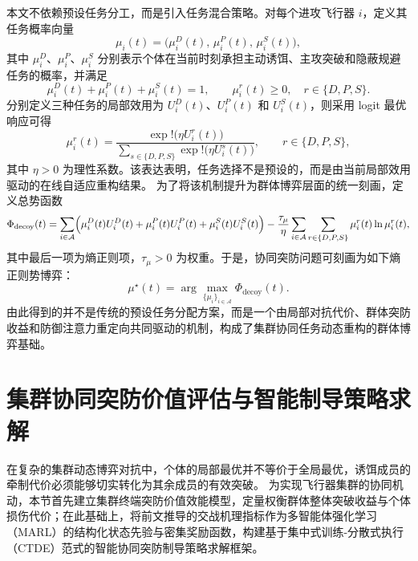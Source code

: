 本文不依赖预设任务分工，而是引入任务混合策略。对每个进攻飞行器 $i$，定义其任务概率向量
\begin{equation}
\mu_i(t)=
\bigl(
\mu_i^{D}(t),\,
\mu_i^{P}(t),\,
\mu_i^{S}(t)
\bigr),
\end{equation}
其中 $\mu_i^{D}$、$\mu_i^{P}$、$\mu_i^{S}$ 分别表示个体在当前时刻承担主动诱饵、主攻突破和隐蔽规避任务的概率，并满足
\begin{equation}
\mu_i^{D}(t)+\mu_i^{P}(t)+\mu_i^{S}(t)=1,\qquad
\mu_i^{r}(t)\ge 0,\quad r\in\{D,P,S\}.
\end{equation}
分别定义三种任务的局部效用为 $U_i^{D}(t)$、$U_i^{P}(t)$ 和 $U_i^{S}(t)$，则采用 logit 最优响应可得
\begin{equation}
\mu_i^{r}(t)
=
\frac{\exp!\bigl(\eta U_i^{r}(t)\bigr)}
{\sum\limits_{s\in\{D,P,S\}}\exp!\bigl(\eta U_i^{s}(t)\bigr)},
\qquad r\in\{D,P,S\},
\label{eq:role-logit}
\end{equation}
其中 $\eta>0$ 为理性系数。该表达表明，任务选择不是预设的，而是由当前局部效用驱动的在线自适应重构结果。
为了将该机制提升为群体博弈层面的统一刻画，定义总势函数
\begin{equation}
\Phi_{\mathrm{decoy}}(t)
=
\sum_{i\in\mathcal{A}}
\Bigl(
\mu_i^{D}(t)U_i^{D}(t)
+
\mu_i^{P}(t)U_i^{P}(t)
+
\mu_i^{S}(t)U_i^{S}(t)
\Bigr)
-
\frac{\tau_{\mu}}{\eta}
\sum_{i\in\mathcal{A}}
\sum_{r\in\{D,P,S\}}
\mu_i^{r}(t)\ln \mu_i^{r}(t),
\end{equation}
其中最后一项为熵正则项，$\tau_{\mu}>0$ 为权重。于是，协同突防问题可刻画为如下熵正则势博弈：
\begin{equation}
\mu^{\star}(t)
=
\arg\max_{\{\mu_i\}_{i\in\mathcal{A}}}
\Phi_{\mathrm{decoy}}(t).
\end{equation}
由此得到的并不是传统的预设任务分配方案，而是一个由局部对抗代价、群体突防收益和防御注意力重定向共同驱动的机制，构成了集群协同任务动态重构的群体博弈基础。



\section{集群协同突防价值评估与智能制导策略求解}

在复杂的集群动态博弈对抗中，个体的局部最优并不等价于全局最优，诱饵成员的牵制代价必须能够切实转化为其余成员的有效突破。
为实现飞行器集群的协同机动，本节首先建立集群终端突防价值效能模型，定量权衡群体整体突破收益与个体损伤代价；在此基础上，将前文推导的交战机理指标作为多智能体强化学习（MARL）的结构化状态先验与密集奖励函数，构建基于集中式训练-分散式执行（CTDE）范式的智能协同突防制导策略求解框架。

